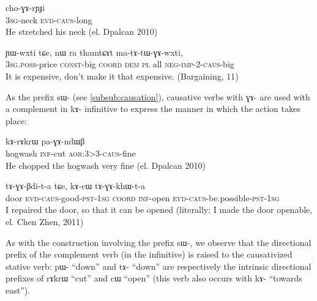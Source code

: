 \documentclass[oldfontcommands,oneside,a4paper,11pt]{memoir}
\newcommand{\ipa}[1]{{\phon #1}} %
\newcommand{\aor}{\textsc{aor}}
\newcommand{\caus}{\textsc{caus}}
\newcommand{\coord}{\textsc{coord}}
\newcommand{\const}{\textsc{const}}
\newcommand{\dem}{\textsc{dem}}
\newcommand{\evd}{\textsc{evd}}
\newcommand{\imp}{\textsc{imp}}
\newcommand{\inftv}{\textsc{inf}}
\newcommand{\negat}{\textsc{neg}}
\newcommand{\pl}{\textsc{pl}}
\newcommand{\poss}{\textsc{poss}}
\newcommand{\pst}{\textsc{pst}}
\newcommand{\sg}{\textsc{sg}}
\begin{document}
\begin{exe}
\ex 
\gll \ipa{ɯ-mke}  	\ipa{cho-ɣɤ-rɲɟi} \\
3\sg{}-neck \evd{}-\caus{}-long \\
 \glt  He stretched his neck (el. Dpalcan 2010)
   \end{exe}
 
 \begin{exe}
\ex 
\gll   \ipa{ɯ-phɯ} \ipa{ɲɯ-wxti} \ipa{tɕe}, \ipa{nɯ} \ipa{ra} \ipa{thamtɕɤt} \ipa{ma-tɤ-tɯ-ɣɤ-wxti},\\
 3\sg{}.\poss{}-price \const{}-big \coord{} \dem{} \pl{} all \negat{}-\imp{}-2-\caus{}-big \\
 \glt  It is expensive, don't make it that expensive. (Bargaining, 11) 
   \end{exe}
 
 
As the prefix \ipa{sɯ-} (see \ref{subsub:causation}), causative verbs with \ipa{ɣɤ-} are used with a complement in \ipa{kɤ-} infinitive to express the manner in which the action takes place:

\begin{exe}
\ex 
\gll \ipa{paʁndza}  	\ipa{kɤ-rɤkrɯ}  	\ipa{pa-ɣɤ-ndɯβ}  \\
hogwash \inftv{}-cut \aor{}:3>3-\caus{}-fine \\
 \glt  He chopped the hogwash very fine (el. Dpalcan 2010)
   \end{exe}
   
 \begin{exe}
\ex 
\gll \ipa{kɯm}  	\ipa{tɤ-ɣɤ-βdi-t-a}  	\ipa{tɕe,}  	\ipa{kɤ-cɯ}  	\ipa{tɤ-ɣɤ-khɯ-t-a}  	  \\
door \evd{}-\caus{}-good-\pst{}-1\sg{} \coord{} \inftv{}-open \evd{}-\caus{}-be.possible-\pst{}-1\sg{} \\
 \glt   I repaired the door, so that it can be opened (literally: I made the door openable, el. Chen Zhen, 2011)
   \end{exe}

    
As with the construction involving the prefix \ipa{sɯ-}, we observe that the directional prefix of the complement verb (in the infinitive) is raised to the causativized stative verb: \ipa{pɯ-} ``down'' and  \ipa{tɤ-} ``down'' are respectively the intrinsic directional prefixes of \ipa{rɤkrɯ} ``cut'' and  \ipa{cɯ} ``open'' (this verb also occurs with \ipa{kɤ-} ``towards east''). 
 
\end{document}
